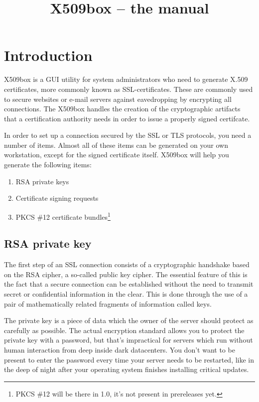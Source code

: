 \documentclass[a4paper,12pt]{article}
\begin{document}
\title{X509box -- the manual}
\maketitle
\section{Introduction}
X509box is a GUI utility for system administrators who need to generate X.509 certificates, more commonly known as SSL-certificates. These are commonly used to secure websites or e-mail servers against eavedropping by encrypting all connections. The X509box handles the creation of the cryptographic artifacts that a certification authority needs in order to issue a properly signed certifcate.

In order to set up a connection secured by the SSL or TLS protocols, you need a number of items. Almost all of these items can be generated on your own workstation, except for the signed certificate itself. X509box will help you generate the following items:
\begin{enumerate}
\item RSA private keys
\item Certificate signing requests
\item PKCS \#12 certificate bundles\footnote{PKCS \#12 will be there in 1.0, it's not present in prereleases yet.}
\end{enumerate}

\subsection{RSA private key}
The first step of an SSL connection consists of a cryptographic handshake based on the RSA cipher, a so-called public key cipher. The essential feature of this is the fact that a secure connection can be established without the need to transmit secret or confidential information in the clear. This is done through the use of a pair of mathematically related fragments of information called keys.

The private key is a piece of data which the owner of the server should protect as carefully as possible. The actual encryption standard allows you to protect the private key with a password, but that's impractical for servers which run without human interaction from deep inside dark datacenters. You don't want to be present to enter the password every time your server needs to be restarted, like in the deep of night after your operating system finishes installing critical updates.
\end{document}
